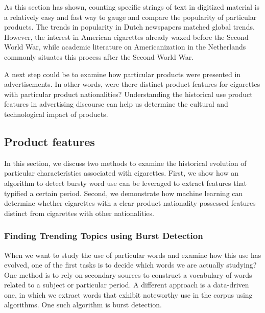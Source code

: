 \documentclass[USenglish]{article}
\begin{document}
As this section has shown, counting specific strings of text in digitized material is a relatively easy and fast way to gauge and compare the popularity of particular products. The trends in popularity in Dutch newspapers matched global trends. However, the interest in American cigarettes already waxed before the Second World War, while academic literature on Americanization in the Netherlands commonly situates this process after the Second World War.

A next step could be to examine how particular products were presented in advertisements. In other words, were there distinct product features for cigarettes with particular product nationalities? Understanding the historical use product features in advertising discourse can help us determine the cultural and technological impact of products. 

\subsection{Product features}
In this section, we discuss two methods to examine the historical evolution of particular characteristics associated with cigarettes. First, we show how an algorithm to detect bursty word use can be leveraged to extract features that typified a certain period. Second, we demonstrate how machine learning can  determine whether cigarettes with a clear product nationality possessed  features distinct from cigarettes with other nationalities. 

\subsubsection{Finding Trending Topics using Burst Detection}
When we want to study the use of particular words and examine how this use has evolved, one of the first tasks is to decide which words we are actually studying? One method is to rely on secondary sources to construct a vocabulary of words related to a subject or particular period. A different approach is a data-driven one, in which we extract words that exhibit noteworthy use in the corpus using algorithms. One such algorithm is burst detection.
\end{document}
